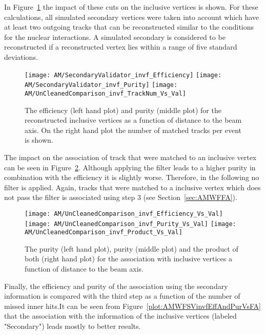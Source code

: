 In Figure~\ref{plot:AMWFSVinvfEffAndPurDC} the impact of these cuts on the inclusive vertices is shown. For these calculations, all simulated secondary vertices were taken into account which have at least two outgoing tracks that can be reconstructed similar to the conditions for the nuclear interactions. A simulated secondary is considered to be reconstructed if a reconstructed vertex lies within a range of five standard deviations. 

\begin{figure}[!ht]
  \centering
  \texttt{[image: AM/SecondaryValidator\_invf\_Efficiency]}
  \texttt{[image: AM/SecondaryValidator\_invf\_Purity]}
  \texttt{[image: AM/UnCleanedComparison\_invf\_TrackNum\_Vs\_Val]}
  \caption[Purity and efficiency of the reconstructed inclusive vertices as a function of distance to the beam axis and number of matched tracks]{The efficiency (left hand plot) and purity (middle plot) for the reconstructed inclusive vertices as a function of distance to the beam axis. On the right hand plot the number of matched tracks per event is shown. \label{plot:AMWFSVinvfEffAndPurDC}}
\end{figure}

The impact on the association of track that were matched to an inclusive vertex can be seen in Figure~\ref{plot:AMWFSVinvfEffAndPurRT}. Although applying the filter leads to a higher purity in combination with the efficiency it is slightly worse. Therefore, in the following no filter is applied. Again, tracks that were matched to a inclusive vertex which does not pass the filter is associated using step 3 (see Section~\ref{sec:AMWFFA}).

\begin{figure}[!ht]
  \centering
  \texttt{[image: AM/UnCleanedComparison\_invf\_Efficiency\_Vs\_Val]}
  \texttt{[image: AM/UnCleanedComparison\_invf\_Purity\_Vs\_Val]}
  \texttt{[image: AM/UnCleanedComparison\_invf\_Product\_Vs\_Val]}
  \caption[Efficiency, purity and their product for the association with inclusive vertices a function of distance to the beam axis]{The purity (left hand plot), purity (middle plot) and the product of both (right hand plot) for the association with inclusive vertices a function of distance to the beam axis. \label{plot:AMWFSVinvfEffAndPurRT}}
\end{figure}

Finally, the efficiency and purity of the association using the secondary information is compared with the third step as a function of the number of missed inner hits.It can be seen from Figure~\ref{plot:AMWFSVinvfEffAndPurVsFA} that the association with the information of the inclusive vertices (labeled "Secondary") leads mostly to better results.

